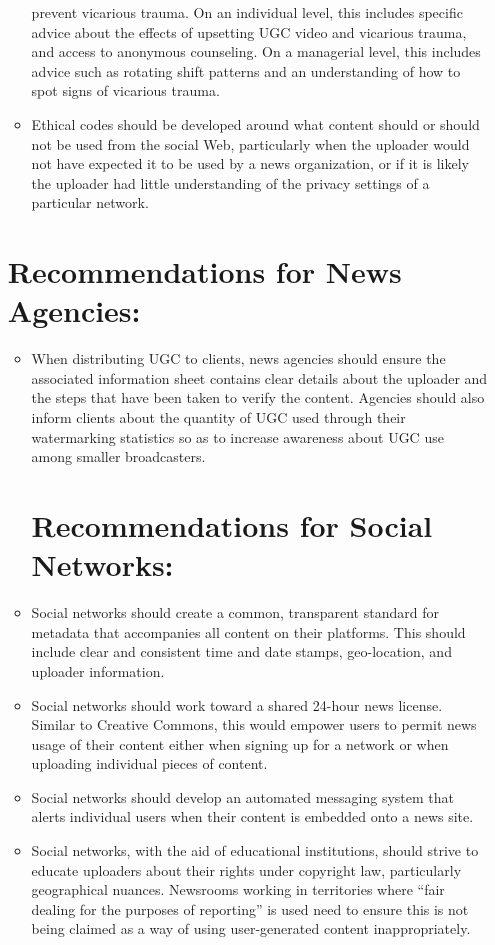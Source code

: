 \begin{enumerate}
\begin{itemize}
prevent vicarious trauma. On an individual level, this includes
specific advice about the effects of upsetting UGC video and
vicarious trauma, and access to anonymous counseling. On
a managerial level, this includes advice such as rotating
shift patterns and an understanding of how to spot signs of
vicarious trauma.
\item Ethical codes should be developed around what content should
or should not be used from the social Web, particularly when the
uploader would not have expected it to be used by a news organization,
or if it is likely the uploader had little understanding of
the privacy settings of a particular network.
\end{itemize}

\section{Recommendations for News Agencies:}
\begin{itemize}
\item When distributing UGC to clients, news agencies should ensure
the associated information sheet contains clear details about
the uploader and the steps that have been taken to verify the
content. Agencies should also inform clients about the quantity
of UGC used through their watermarking statistics so as to
increase awareness about UGC use among smaller broadcasters.

\section{Recommendations for Social Networks:}
\item Social networks should create a common, transparent standard
for metadata that accompanies all content on their platforms.
This should include clear and consistent time and date stamps,
geo-location, and uploader information.
\item Social networks should work toward a shared 24-hour news
license. Similar to Creative Commons, this would empower
users to permit news usage of their content either when signing
up for a network or when uploading individual pieces of content.
\item Social networks should develop an automated messaging system
that alerts individual users when their content is embedded onto
a news site.
\item Social networks, with the aid of educational institutions, should
strive to educate uploaders about their rights under copyright
law, particularly geographical nuances. Newsrooms working in
territories where ``fair dealing for the purposes of reporting'' is
used need to ensure this is not being claimed as a way of using
user-generated content inappropriately.
\end{itemize}


\end{enumerate}
